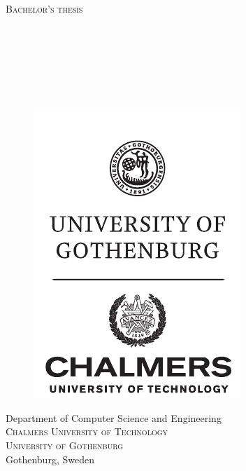 \newpage
\restoregeometry
\thispagestyle{empty}
\mbox{}
\begin{small}

\newpage
\thispagestyle{empty}
\begin{center}
	\textsc{\large Bachelor's thesis \the\year}\\[4cm]		%
	\textbf{\Large \multiLineTitle{0.2cm}} \\[1cm]
	{\large \oneLineSubtitle}\\[1cm]
	{\large \MARTIN}\\[1ex]
	{\large \FELIX}\\[1ex]
	{\large \HANNES}\\[1ex]
	{\large \MARCUS}\\[1ex]
	{\large \JAKOB}
	
	\vfill	
	\begin{figure}[H]
    	\centering
    	\includegraphics[width=0.25\pdfpagewidth]{modules/frontmatter/ChGULogoHog.pdf}
	\end{figure}	\vspace{5mm}	
	
	Department of Computer Science and Engineering\\
	\textsc{Chalmers University of Technology} \\
	\textsc{University of Gothenburg} \\
	Gothenburg, Sweden \the\year \\
\end{center}


\end{small}
